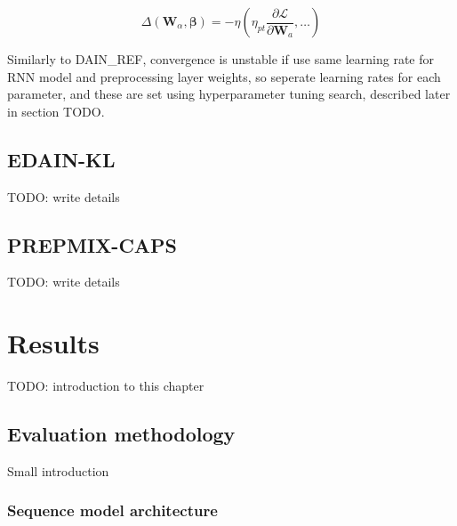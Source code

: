 \documentclass{statsmsc}
\begin{document}
\begin{equation}
    \Delta (\mathbf{W}_\alpha,\mathbf{\beta})=-\eta\left( \eta_{pt} \frac{\partial \mathcal{L}}{\partial \mathbf{W}_a},\dots  \right)
\end{equation}

Similarly to DAIN\_REF, convergence is unstable if use same learning rate for RNN model and
preprocessing layer weights, so seperate learning rates for each parameter, and these are
set using hyperparameter tuning search, described later in section TODO.



\section{EDAIN-KL}%
\label{sec:EDAIN-KL}

TODO: write details


\section{PREPMIX-CAPS}%
\label{sec:PREPMIX-CAPS}

TODO: write details


\chapter{Results} %

TODO: introduction to this chapter

\section{Evaluation methodology}%
\label{sec:Evaluation methodology}%

Small introduction

\subsection{Sequence model architecture}%
\label{sub:Sequence model architecture}
\end{document}
